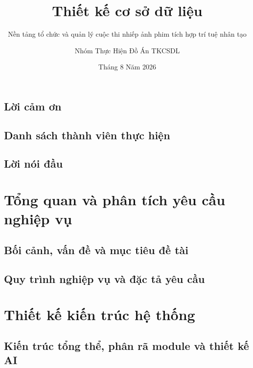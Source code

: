 \documentclass[a4paper,11pt,leqno,oneside,openany]{book}
\begin{document}
\title{Thiết kế cơ sở dữ liệu}

\subtitle{Nền tảng tổ chức và quản lý cuộc thi nhiếp ảnh phim tích hợp trí tuệ nhân tạo}

\author{Nhóm Thực Hiện Đồ Án TKCSDL}

\date{Tháng 8 Năm 2026}



\frontmatter

\chapter{Lời cảm ơn}


\chapter{Danh sách thành viên thực hiện}


\clearpage
\tableofcontents
\clearpage
\listoftables
\clearpage
\listoffigures
\clearpage

\chapter{Lời nói đầu}


\mainmatter

\part{Tổng quan và phân tích yêu cầu nghiệp vụ}\label{p:requirements}

\chapter{Bối cảnh, vấn đề và mục tiêu đề tài}\label{c:problem_objectives}


\chapter{Quy trình nghiệp vụ và đặc tả yêu cầu}\label{c:business_requirements}


\part{Thiết kế kiến trúc hệ thống}\label{p:architecture}

\chapter{Kiến trúc tổng thể, phân rã module và thiết kế AI}\label{c:architecture}

\end{document}
